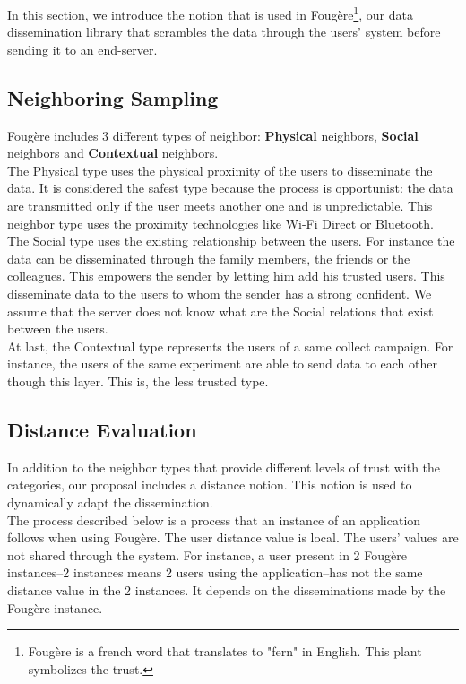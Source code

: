 

In this section, we introduce the notion that is used in Foug\`ere\footnote{Foug\`ere is a french word that translates to "fern" in English. This plant symbolizes the trust.}, our data dissemination library that scrambles the data through the users' system before sending it to an end-server.

\subsection{Neighboring Sampling}

Foug\`ere includes 3 different types of neighbor: \textbf{Physical} neighbors, \textbf{Social} neighbors and \textbf{Contextual} neighbors.
\\

The Physical type uses the physical proximity of the users to disseminate the data.
It is considered the safest type because the process is opportunist: the data are transmitted only if the user meets another one and is unpredictable.
This neighbor type uses the proximity technologies like Wi-Fi Direct or Bluetooth.
\\

The Social type uses the existing relationship between the users.
For instance the data can be disseminated through the family members, the friends or the colleagues.
This empowers the sender by letting him add his trusted users.
This disseminate data to the users to whom the sender has a strong confident.
We assume that the server does not know what are the Social relations that exist between the users.
\\

At last, the Contextual type represents the users of a same collect campaign.
For instance, the users of the same experiment are able to send data to each other though this layer. 
This is, the less trusted type.

\subsection{Distance Evaluation}

In addition to the neighbor types that provide different levels of trust with the categories, our proposal includes a distance notion.
This notion is used to dynamically adapt the dissemination.
\\

The process described below is a process that an instance of an application follows when using Foug\`ere.
The user distance value is local.
The users' values are not shared through the system.
For instance, a user present in 2 Foug\`ere instances--2 instances means 2 users using the application--has not the same distance value in the 2 instances.
It depends on the disseminations made by the Foug\`ere instance.
\\

